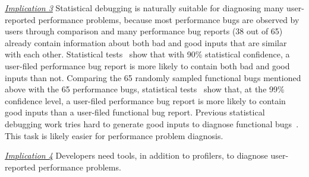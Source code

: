 \underline{\textit{Implication 3}}
Statistical debugging is naturally suitable for diagnosing many
user-reported performance problems,
because most performance bugs are observed by users through comparison and many
performance bug reports (38 out of 65) already contain information about 
both bad and good inputs that are similar with each other.
Statistical tests~\citep{ztest} show that with 90\% statistical confidence, 
a user-filed performance bug report is more likely to contain both 
bad and good inputs than not.
Comparing the 65 randomly sampled functional bugs mentioned above with the 65
performance bugs, 
statistical tests~\citep{ztest} show that, at the 99\% confidence level, 
a user-filed performance bug report is more likely to contain
good inputs than a user-filed
functional bug report.
Previous statistical debugging work tries hard to generate good
inputs to diagnose functional bugs~\citep{delta}. This task is
likely easier for performance problem diagnosis.

\underline{\textit{Implication 4}}
Developers need tools, in addition to profilers, to diagnose
user-reported performance problems.
